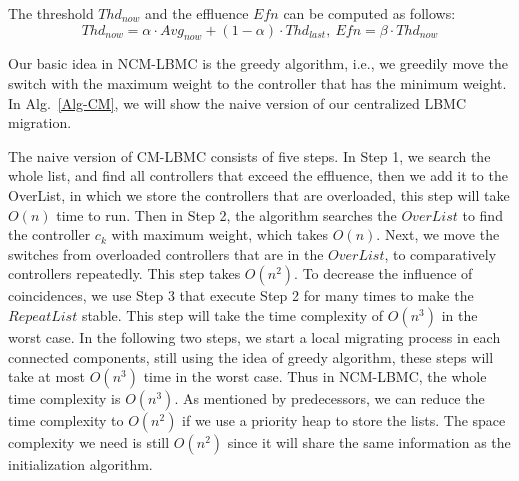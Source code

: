 The threshold $Thd_{now}$ and the effluence $Efn$ can be computed as follows:
\[Thd_{now}=\alpha \cdot Avg_{now} + (1-\alpha) \cdot Thd_{last},~ Efn=\beta \cdot Thd_{now}\]

Our basic idea in NCM-LBMC is the greedy algorithm, i.e., we greedily move the switch with the maximum weight to the controller that has the minimum weight. In Alg.~\ref{Alg-CM}, we will show the naive version of our centralized LBMC migration.

The naive version of CM-LBMC consists of five steps. In Step 1, we search the whole list, and find all controllers that exceed the effluence, then we add it to the OverList, in which we store the controllers that are overloaded, this step will take $O(n)$ time to run. Then in Step 2, the algorithm searches the $OverList$ to find the controller $c_k$ with maximum weight, which takes $O(n)$. Next, we move the switches from overloaded controllers that are in the $OverList$, to comparatively  controllers repeatedly. This step takes $O(n^2)$. To decrease the influence of coincidences, we use Step 3 that execute Step 2 for many times to make the $RepeatList$ stable. This step will take the time complexity of $O(n^3)$ in the worst case. In the following two steps, we start a local migrating process in each connected components, still using the idea of greedy algorithm, these steps will take at most $O(n^3)$ time in the worst case. Thus in NCM-LBMC, the whole time complexity is $O(n^3)$. As mentioned by predecessors, we can reduce the time complexity to $O(n^2)$ if we use a priority heap to store the lists. The space complexity we need is still $O(n^2)$ since it will share the same information as the initialization algorithm.

